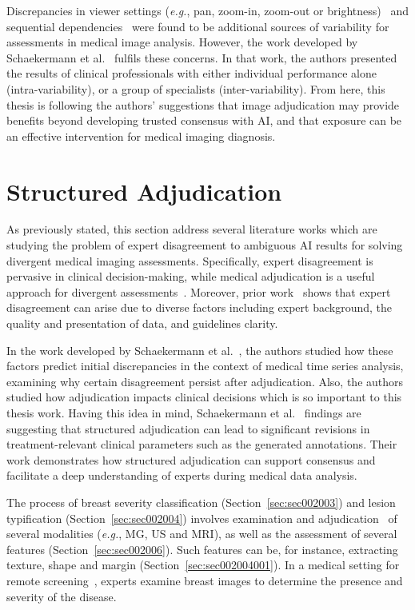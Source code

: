 Discrepancies in viewer settings ({\it e.g.}, pan, zoom-in, zoom-out or brightness)~\cite{10.1145/3359178} and sequential dependencies~\cite{schaekermann2018expert} were found to be additional sources of variability for assessments in medical image analysis.
However, the work developed by Schaekermann et al.~\cite{10.1145/3313831.3376290} fulfils these concerns.
In that work, the authors presented the results of clinical professionals with either individual performance alone (intra-variability), or a group of specialists (inter-variability).
From here, this thesis is following the authors' suggestions that image adjudication may provide benefits beyond developing trusted consensus with \ac{AI}, and that exposure can be an effective intervention for medical imaging diagnosis.

\section{Structured Adjudication}
\label{sec:sec003005}

As previously stated, this section address several literature works which are studying the problem of expert disagreement to ambiguous \ac{AI} results for solving divergent medical imaging assessments.
Specifically, expert disagreement is pervasive in clinical decision-making, while medical adjudication is a useful approach for divergent assessments~\cite{10.1145/3359178, SchaekermannMike2020}.
Moreover, prior work~\cite{Aroyo_Welty_2014} shows that expert disagreement can arise due to diverse factors including expert background, the quality and presentation of data, and guidelines clarity.

In the work developed by Schaekermann et al.~\cite{10.1145/3359178}, the authors studied how these factors predict initial discrepancies in the context of medical time series analysis, examining why certain disagreement persist after adjudication.
Also, the authors studied how adjudication impacts clinical decisions which is so important to this thesis work.
Having this idea in mind, Schaekermann et al.~\cite{10.1145/3359178} findings are suggesting that structured adjudication can lead to significant revisions in treatment-relevant clinical parameters such as the generated annotations.
Their work demonstrates how structured adjudication can support consensus and facilitate a deep understanding of experts during medical data analysis.

The process of breast severity classification (Section~\ref{sec:sec002003}) and lesion typification (Section~\ref{sec:sec002004}) involves examination and adjudication~\cite{DODGION2017196} of several modalities ({\it e.g.}, \ac{MG}, \ac{US} and \ac{MRI}), as well as the assessment of several features (Section~\ref{sec:sec002006}).
Such features can be, for instance, extracting texture, shape and margin (Section~\ref{sec:sec002004001}).
In a medical setting for remote screening~\cite{10.1200EDBK200141}, experts examine breast images to determine the presence and severity of the disease.

